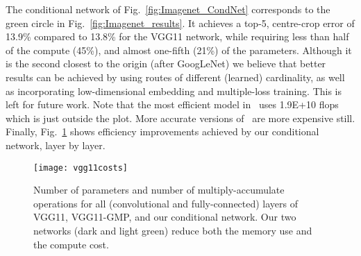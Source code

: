 \documentclass[thesis]{subfiles}
\begin{document}
The conditional network of Fig.~\ref{fig:Imagenet_CondNet} 
corresponds to the green circle in Fig.~\ref{fig:Imagenet_results}.
It achieves a top-5, centre-crop error of
13.9\% compared to 13.8\% for the VGG11 network, while requiring less than half of the compute (45\%),
 and almost one-fifth (21\%) of the parameters.
Although it is the second closest to the origin (after GoogLeNet) we believe that better results can be achieved 
by using routes of different (learned) cardinality, as well as incorporating low-dimensional embedding and multiple-loss training. This is left for future work. 
Note that the most efficient model in~\cite{He2015delving} uses 1.9E+10 flops which is just outside the plot. 
More accurate versions of~\cite{He2015delving} are more expensive still.
Finally, Fig.~\ref{fig:VggPerLayerCost} shows efficiency improvements achieved by our conditional network, layer by layer.

\begin{figure}[t]
\centering
\texttt{[image: vgg11costs]}
\caption[Cost of VGG11-based networks per layer]{
   Number of parameters and number of multiply-accumulate operations for all (convolutional and fully-connected) 
   layers of VGG11, VGG11-GMP, and our conditional network. Our two networks (dark and light green) 
   reduce both the memory use and the compute cost.}
\label{fig:VggPerLayerCost}
\end{figure}





\end{document}

